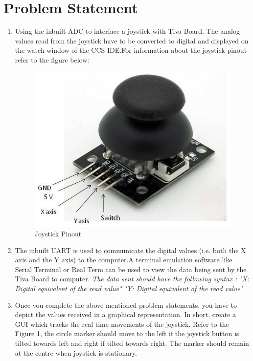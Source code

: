\documentclass[a4paper,12pt,oneside]{book}
\begin{document}
\section{Problem Statement}
\begin{enumerate}
\item 
Using the inbuilt ADC to interface a joystick with Tiva Board. The analog values read from the joystick have to be converted to digital and displayed on the watch window of the CCS IDE.For information about the joystick pinout refer to the figure below:
\begin{figure}
\centering
\includegraphics[scale=0.5]{joystick_pinout.jpg}
\caption{Joystick Pinout}
\end{figure}
\item
The inbuilt UART is used to communicate the digital values (i.e. both the X axis and the Y axis) to the computer.A terminal emulation software like Serial Terminal or Real Term can be used to view the data being sent by the Tiva Board to computer.
\newline
\hspace{10mm} \textit{The data sent should have the following syntax :}
\newline
\hspace{10mm}\textit{"X: Digital equivalent of the read value"}
\newline
\hspace{10mm}\textit{"Y: Digital equivalent of the read value"}
\item
Once you complete the above mentioned problem statements, you have to depict the values received in a graphical representation. In short, create a GUI which tracks the real time movements of the joystick.
\newline
Refer to the Figure 1, the circle marker should move to the left if the joystick button is tilted towards left and right if tilted towards right. The marker should remain at the centre when joystick is stationary.
\end{enumerate}
\end{document}
